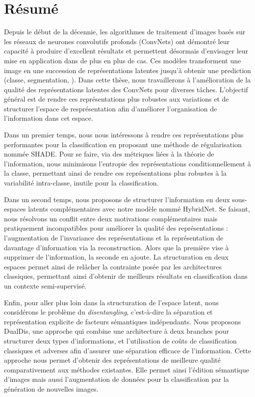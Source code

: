 \cleardoublepage


\chapter{R\'esum\'e}


Depuis le début de la décennie, les algorithmes de traitement d'images basés sur les réseaux de neurones convolutifs profonds (ConvNets) ont démontré leur capacité à produire d'excellent résultats et permettent désormais d'envisager leur mise en application dans de plus en plus de cas. Ces modèles transforment une image en une succession de représentations latentes jusqu'à obtenir une prediction (classe, segmentation, \etc).
%
Dans cette thèse, nous travaillerons à l'amélioration de la qualité des représentations latentes des ConvNets pour diverses tâches. L'objectif général est de rendre ces représentations plus robustes aux variations et de structurer l'espace de resprésentation afin d'améliorer l'organisation de l'information dans cet espace.

Dans un premier temps, nous nous intéressons à rendre ces représentations plus performantes pour la classification en proposant une méthode de régularisation nommée SHADE. Pour se faire, via des métriques liées à la théorie de l'information, nous minimisons l'entropie des représentations conditionnellement à la classe, permettant ainsi de rendre ces représentations plus robustes à la variabilité intra-classe, inutile pour la classification.

Dans un second temps, nous proposons de structurer l'information en deux sous-espaces latents complémentaires avec notre modèle nommé HybridNet. Se faisant, nous résolvons un conflit entre deux motivations complémentaires mais pratiquement incompatibles pour améliorer la qualité des représentations : l'augmentation de l'invariance des représentations et la représentation de davantage d'information via la reconstruction. Alors que la première vise à supprimer de l'information, la seconde en ajoute. La structuration en deux espaces permet ainsi de relâcher la contrainte posée par les architectures classiques, permettant ainsi d'obtenir de meilleurs résultats en classification dans un contexte semi-supervisé.

Enfin, pour aller plus loin dans la structuration de l'espace latent, nous considérons le problème du \textit{disentangling}, c'est-à-dire la séparation et représentation explicite de facteurs sémantiques indépendants. Nous proposons DualDis, une approche qui combine une architecture à deux branches pour structurer deux types d'informations, et l'utilisation de coûts de classification classiques et adverses afin d'assurer une séparation efficace de l'information. Cette approche nous permet d'obtenir des représentations de meilleure qualité comparativement aux méthodes existantes. Elle permet ainsi l'édition sémantique d'images mais aussi l'augmentation de données pour la classification par la génération de nouvelles images.

